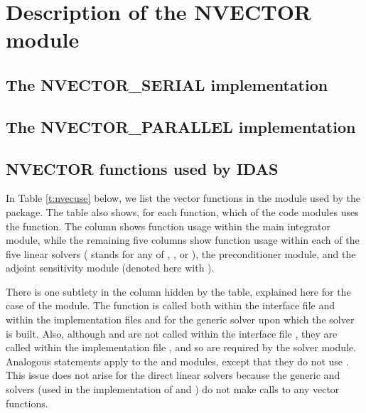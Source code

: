 \chapter{Description of the NVECTOR module}\label{s:nvector}


\section{The NVECTOR\_SERIAL implementation}\label{ss:nvec_ser}


\section{The NVECTOR\_PARALLEL implementation}\label{ss:nvec_par}


\section{NVECTOR functions used by IDAS}

In Table \ref{t:nvecuse} below, we list the vector functions in the 
{\nvector} module used by the {\idas} package.
The table also shows, for each function, which of the code modules uses
the function. The {\idas} column shows function usage within the main
integrator module, while the remaining five columns show function usage
within each of the five {\idas} linear solvers ({\idaspils} stands for any
of {\idaspgmr}, {\idaspbcg}, or {\idasptfqmr}), the {\idabbdpre}
preconditioner module, and the {\idas} adjoint sensitivity
module (denoted here with {\idaa}).

There is one subtlety in the {\idaspils} column hidden by the table, explained
here for the case of the {\idaspgmr} module. 
The  function is called both within the interface file
 and within the implementation
files  and  for the generic
{\spgmr} solver upon which the {\idaspgmr} solver is built.  Also, although
 and  are not called within the interface file
, they are called within the implementation file
, and so are required by the {\idaspgmr} solver module.
Analogous statements apply to the {\idaspbcg} and {\idasptfqmr} modules,
except that they do not use .
This issue does not arise for the direct {\idas} linear solvers because
the generic {\dense} and {\band} solvers (used in the implementation of
{\idadense} and {\idaband}) do not make calls to any vector functions.


